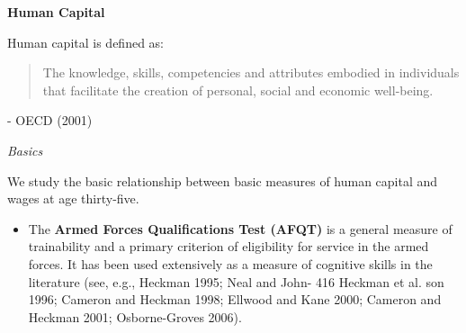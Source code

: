 \begin{frame}\begin{center}
    \LARGE\textbf{Human Capital}
\end{center}\end{frame}
\begin{frame}
Human capital is defined as:
\vspace{\baselineskip}

\begin{quote}
The knowledge, skills, competencies and attributes embodied in individuals that facilitate
the creation of personal, social and economic well-being.
\end{quote}\vspace{-0.5pt} \hspace{6cm} - OECD (2001)
\end{frame}
\begin{frame}\begin{center}
\LARGE\textit{Basics}
\end{center}\end{frame}
\begin{frame}
We study the basic relationship between basic measures of human capital and wages at age thirty-five.
\end{frame}
\begin{frame}
\begin{itemize}
\item The \textbf{ Armed Forces Qualifications Test (AFQT)} is a general measure of trainability and a primary criterion of eligibility for service in the armed forces. It has been used extensively as a measure of cognitive skills in the literature (see, e.g., Heckman 1995; Neal and John-
416 Heckman et al. son 1996; Cameron and Heckman 1998; Ellwood and Kane 2000; Cameron
and Heckman 2001; Osborne-Groves 2006).
\end{itemize}
\end{frame}
